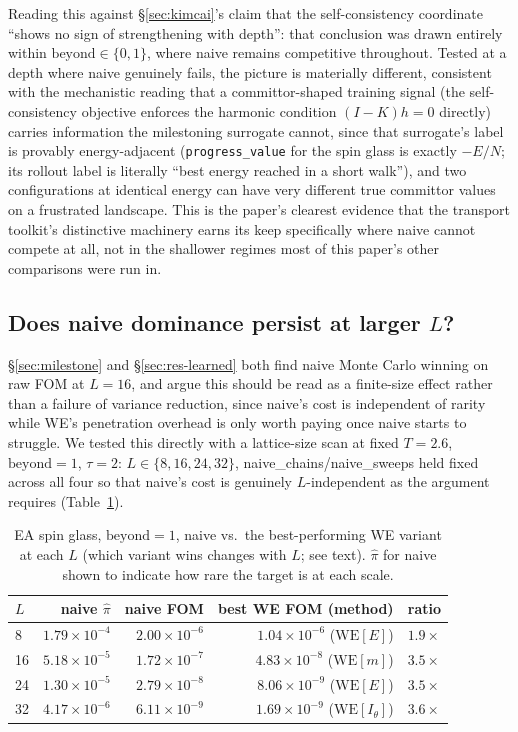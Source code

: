 \documentclass[11pt]{article}
\begin{document}
	Reading this against \S\ref{sec:kimcai}'s claim that the self-consistency
		coordinate ``shows no sign of strengthening with depth'': that conclusion was drawn
	entirely within $\mathrm{beyond}\in\{0,1\}$, where naive remains competitive throughout.
	Tested at a depth where naive genuinely fails, the picture is materially different,
	consistent with the mechanistic reading that a committor-shaped training signal (the
	self-consistency objective enforces the harmonic condition $(I-K)h=0$ directly) carries
	information the milestoning surrogate cannot, since that surrogate's label is provably
	energy-adjacent (\texttt{progress\_value} for the spin glass is exactly $-E/N$; its
	rollout label is literally ``best energy reached in a short walk''), and two
	configurations at identical energy can have very different true committor values on a
	frustrated landscape. This is the paper's clearest evidence that the transport toolkit's
	distinctive machinery earns its keep specifically where naive cannot compete at all, not
	in the shallower regimes most of this paper's other comparisons were run in.

	\subsection{Does naive dominance persist at larger $L$?}
	\label{sec:lscaling}
	\S\ref{sec:milestone} and \S\ref{sec:res-learned} both find naive Monte Carlo winning on
	raw FOM at $L=16$, and argue this should be read as a finite-size effect rather than a
	failure of variance reduction, since naive's cost is independent of rarity while WE's
	penetration overhead is only worth paying once naive starts to struggle. We tested this
	directly with a lattice-size scan at fixed $T=2.6$, $\mathrm{beyond}=1$, $\tau=2$: $L\in
	\{8,16,24,32\}$, naive\_chains/naive\_sweeps held fixed across all four so that naive's
	cost is genuinely $L$-independent as the argument requires (Table~\ref{tab:lscaling}).
	
	\begin{table}[h]
		\centering\small
		\caption{EA spin glass, $\mathrm{beyond}=1$, naive vs.\ the best-performing WE variant at
			each $L$ (which variant wins changes with $L$; see text). $\hat\pi$ for naive shown to
			indicate how rare the target is at each scale.}
		\label{tab:lscaling}
		\begin{tabular}{lrrrr}
			\toprule
			$L$ & naive $\hat\pi$ & naive FOM & best WE FOM (method) & ratio \\
			\midrule
			8 & $1.79\times10^{-4}$ & $2.00\times10^{-6}$ & $1.04\times10^{-6}$ ($\mathrm{WE}[E]$) & $1.9\times$ \\
			16 & $5.18\times10^{-5}$ & $1.72\times10^{-7}$ & $4.83\times10^{-8}$ ($\mathrm{WE}[m]$) & $3.5\times$ \\
			24 & $1.30\times10^{-5}$ & $2.79\times10^{-8}$ & $8.06\times10^{-9}$ ($\mathrm{WE}[E]$) & $3.5\times$ \\
			32 & $4.17\times10^{-6}$ & $6.11\times10^{-9}$ & $1.69\times10^{-9}$ ($\mathrm{WE}[I_\theta]$) & $3.6\times$ \\
			\bottomrule
		\end{tabular}
	\end{table}
	
\end{document}
